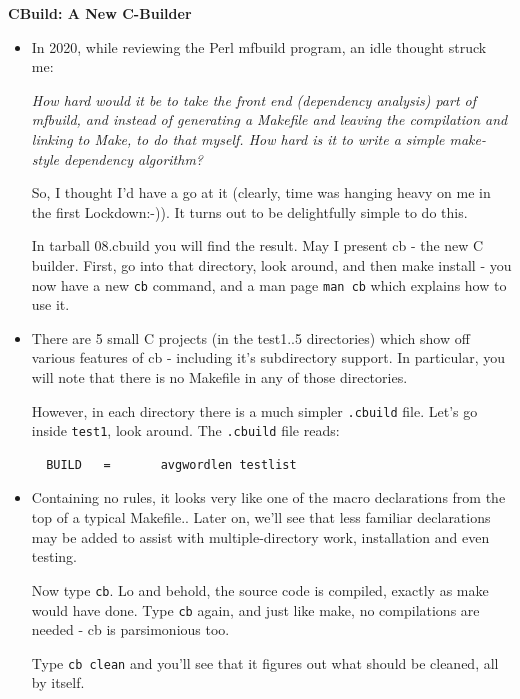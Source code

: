 \documentclass[aspectratio=169]{beamer}
\newcommand\myheading[1]{%
  \par\bigskip
  {\Large\bfseries#1}\par\smallskip}
\begin{document}
\begin{frame}[fragile]

  \myheading{CBuild: A New C-Builder}

    \begin{itemize}
      \item
      In 2020, while reviewing the Perl mfbuild program, an idle thought struck me:

    \pitem
      {\em How hard would it be to take the front end (dependency analysis)
      part of mfbuild, and instead of generating a Makefile and leaving
      the compilation and linking to Make, to do that myself.  How hard is
      it to write a simple make-style dependency algorithm?}

     \pitem
       So, I thought I'd have a go at it (clearly, time was hanging heavy on me
       in the first Lockdown:-)).  It turns out to be delightfully simple to
       do this.

      \pitem
      In \alert{tarball 08.cbuild} you will find the result.  May I present
      \alert{cb} - the new C builder.  
      First, go into that directory, look around,
      and then \alert{make install} - you now have a new \verb+cb+ command,
      and a man page \verb+man cb+ which explains how to use it.

    \end{itemize}

\end{frame}


\begin{frame}[fragile]
  \begin{itemize}

  \item
  There are 5 small C projects (in the test1..5 directories) which show off
  various features of \alert{cb} - including it's subdirectory support.  In
  particular, you will note that there is \alert{no Makefile} in any of
  those directories.

  \pitem
  However, in each directory there is a much simpler \verb+.cbuild+ file.
  Let's go inside \verb+test1+, look around. The \verb+.cbuild+ file reads:

\tiny
\begin{verbatim}
  BUILD   =       avgwordlen testlist
\end{verbatim}
\small

  \item
  Containing no rules, it looks very like one of the macro declarations
  from the top of a typical Makefile..
  \pause
  Later on, we'll see that less familiar declarations may be added to
  assist with multiple-directory work, installation and even testing.

  \pitem
  Now type \verb+cb+.  Lo and behold, the source code is compiled,
  exactly as make would have done.  
  Type \verb+cb+ again, and just like make, no compilations are needed -
  \alert{cb} is parsimonious too.

  \pitem
  Type \verb+cb clean+ and you'll see that it figures out what should be
  cleaned, all by itself.

  \end{itemize}
\end{frame}
\end{document}
